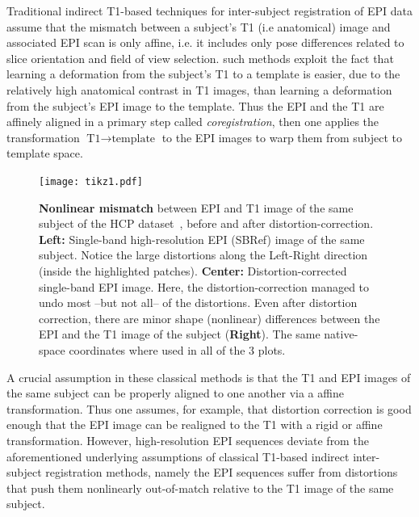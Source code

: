 Traditional indirect T1-based techniques for inter-subject
registration of EPI data assume that the mismatch between a subject's
T1 (i.e anatomical) image and associated EPI scan is only affine,
i.e. it includes only pose differences related to slice orientation
and field of view selection. such methods exploit the
fact that learning a deformation from the subject's T1 to a template
is easier, due to the relatively high anatomical contrast in T1
images, than learning a deformation from the subject's EPI image to the
template.
Thus the EPI and the T1 are affinely aligned in a primary step called
\textit{coregistration}, then one applies the transformation $\text{T1}
\rightarrow \text{template}$ to the EPI images to warp them from subject to
template space. %
\begin{figure}[!htbp]
     \texttt{[image: tikz1.pdf]}
\caption{\textbf{Nonlinear mismatch} between EPI and T1 image of
  the same subject of the HCP dataset~\citep{VanEssen20122222},
  before and after distortion-correction.
\textbf{Left:} Single-band high-resolution EPI (SBRef) image of the
same subject. Notice the large distortions along the Left-Right direction
(inside the highlighted patches). \textbf{Center:} Distortion-corrected
single-band EPI image. Here, the distortion-correction managed to undo
most --but not all-- of the distortions. Even after distortion
correction, there are minor shape (nonlinear) differences between the
EPI and the T1 image of the subject (\textbf{Right}). The same native-space
coordinates where used in all of the 3 plots.}
\label{fig:pb_fig}
\end{figure}

A crucial assumption in these classical methods is  that the T1 and EPI images
of the same subject can be properly aligned to one another via a affine transformation.
Thus one assumes, for example, that distortion correction is
good enough that the EPI image can be realigned to the T1 with a rigid or affine
transformation. However, high-resolution EPI sequences deviate from the
aforementioned underlying assumptions of classical T1-based indirect inter-subject
registration methods, namely the EPI sequences suffer from distortions
that push them nonlinearly out-of-match relative to the T1 image of
the same subject. 
%

